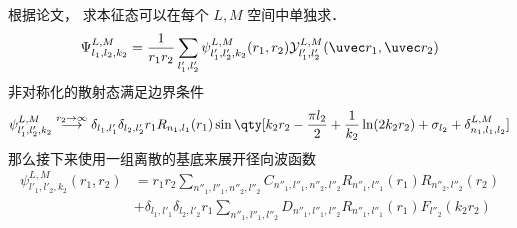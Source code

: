 
根据论文， 求本征态可以在每个 $L,M$ 空间中单独求．
\begin{equation}
\Psi_{l_1,l_2,k_2}^{L,M} = \frac{1}{r_1 r_2}\sum_{l'_1, l'_2}  \psi_{l'_1, l'_2, k_2}^{L, M}(r_1, r_2)\mathcal{Y}_{l'_1, l'_2}^{L, M}(\uvec r_1, \uvec r_2)
\end{equation}
非对称化的散射态满足边界条件
\begin{equation}
\psi_{l'_1,l'_2,k_2}^{L, M} \overset{r_2\to\infty}{\longrightarrow} \delta_{l_1,l'_1}\delta_{l_2,l'_2} r_1 R_{n_1,l_1}(r_1)
\sin\qty[k_2 r_2 - \frac{\pi l_2}{2} +\frac{1}{k_2}\ln(2k_2 r_2) + \sigma_{l_2} + \delta_{n_1,l_1,l_2}^{L,M}]
\end{equation}
那么接下来使用一组离散的基底来展开径向波函数
\begin{equation}
\begin{aligned}
\psi_{l'_1, l'_2,k_2}^{L, M}(r_1, r_2) &= r_1r_2\sum_{n''_1,l''_1,n''_2,l''_2} C_{n''_1,l''_1,n''_2,l''_2} R_{n''_1,l''_1}(r_1) R_{n''_2,l''_2}(r_2)\\
& +\delta_{l_1,l'_1}\delta_{l_2,l'_2} r_1\sum_{n''_1,l''_1,l''_2} D_{n''_1,l''_1,l''_2} R_{n''_1,l''_1}(r_1) F_{l''_2}(k_2 r_2)
\end{aligned}
\end{equation}

